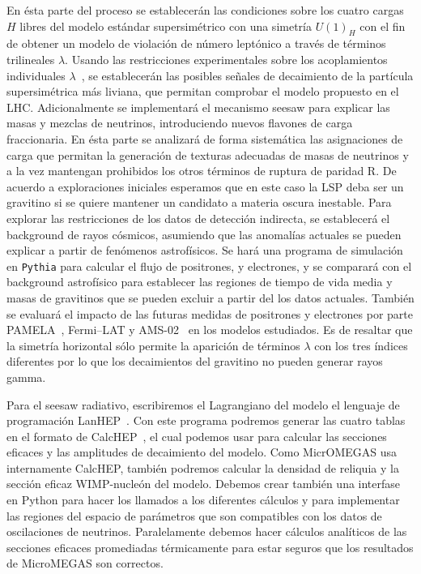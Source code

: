 \begin{itemize}
\begin{proyecto}
  En ésta parte del proceso se establecerán las condiciones sobre los
  cuatro cargas $H$ libres del modelo estándar supersimétrico con una
  simetría $U(1)_H$ con el fin de obtener un modelo de violación de
  número leptónico a través de términos trilineales $\lambda$. Usando
  las restricciones experimentales sobre los acoplamientos
  individuales $\lambda$~\cite{Barbier:2004ez}, se establecerán las
  posibles señales de decaimiento de la partícula supersimétrica más
  liviana, que permitan comprobar el modelo propuesto en el
  LHC. Adicionalmente se implementará el mecanismo seesaw para
  explicar las masas y mezclas de neutrinos, introduciendo nuevos
  flavones de carga fraccionaria.  En ésta parte se analizará de forma
  sistemática las asignaciones de carga que permitan la generación de
  texturas adecuadas de masas de neutrinos y a la vez mantengan
  prohibidos los otros términos de ruptura de paridad R. De acuerdo a
  exploraciones iniciales esperamos que en este caso la LSP deba ser
  un gravitino si se quiere mantener un candidato a materia oscura
  inestable. Para explorar las restricciones de los datos de
  detección indirecta, se establecerá el background de rayos cósmicos,
  asumiendo que las anomalías actuales se pueden explicar a partir de
  fenómenos astrofísicos. Se hará una programa de simulación en
  \texttt{Pythia} \cite{Sjostrand:2006za} para calcular el flujo de
  positrones, y electrones, y se comparará con el background
  astrofísico para establecer las regiones de tiempo de vida media y
  masas de gravitinos que se pueden excluir a partir del los datos
  actuales. También se evaluará el impacto de las futuras medidas de
  positrones y electrones por parte PAMELA~\cite{Adriani:2008zr},
  Fermi--LAT\cite{Abdo:2009zk} y AMS-02~\cite{ams:2009} en los modelos
  estudiados. Es de resaltar que la simetría horizontal sólo permite
  la aparición de términos $\lambda$ con los tres índices diferentes
  por lo que los decaimientos del gravitino no pueden generar rayos
  gamma.
\end{proyecto}

\begin{darkmatter}
\begin{proyecto}
  Para el seesaw radiativo, escribiremos el Lagrangiano del modelo el
  lenguaje de programación LanHEP~\cite{Semenov:2008jy}. Con este
  programa podremos generar las cuatro tablas en el formato de
  CalcHEP~\cite{Pukhov:2004ca}, el cual podemos usar para calcular las
  secciones eficaces y las amplitudes de decaimiento del modelo.  Como
  MicrOMEGAS usa internamente CalcHEP, también podremos calcular la
  densidad de reliquia y la sección eficaz WIMP-nucleón del
  modelo. Debemos crear también una interfase en Python para hacer los
  llamados a los diferentes cálculos y para implementar las regiones
  del espacio de parámetros que son compatibles con los datos de
  oscilaciones de neutrinos. Paralelamente debemos hacer cálculos
  analíticos de las secciones eficaces promediadas térmicamente para
  estar seguros que los resultados de MicroMEGAS son correctos.
\end{proyecto}
\end{darkmatter}



\end{itemize}
